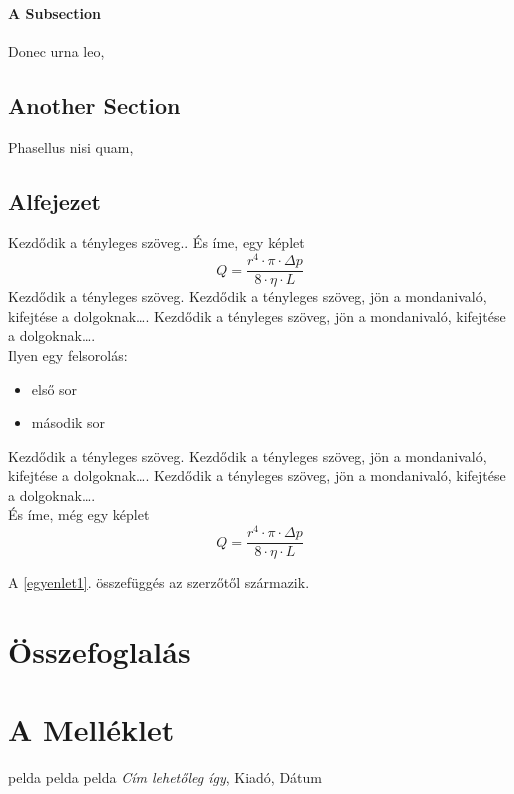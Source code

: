\documentclass[a4paper,12pt,oneside]{book}
\begin{document}
\subsubsection{A Subsection}

Donec urna leo, 

\section{Another Section}

Phasellus nisi quam, 

\section{Alfejezet}
Kezdődik a tényleges szöveg..
És íme, egy képlet
\begin{equation}
Q=\frac{r^4\cdot \pi \cdot \Delta p}{8\cdot \eta\cdot L}
\end{equation}
Kezdődik a tényleges szöveg. Kezdődik a tényleges szöveg, jön a mondanivaló, kifejtése a dolgoknak…. Kezdődik a tényleges szöveg, jön a mondanivaló, kifejtése a dolgoknak….\\

Ilyen egy felsorolás:
\begin{itemize}
	\item első sor
	\item második sor
\end{itemize}
Kezdődik a tényleges szöveg. Kezdődik a tényleges szöveg, jön a mondanivaló, kifejtése a dolgoknak…. Kezdődik a tényleges szöveg, jön a mondanivaló, kifejtése a dolgoknak….\\

És íme, még egy képlet
\begin{equation}\label{egyenlet1}
Q=\frac{r^4\cdot \pi \cdot \Delta p}{8\cdot \eta\cdot L}
\end{equation}

A \ref{egyenlet1}. összefüggés az \cite{irodalom1} szerzőtől származik.
\backmatter
\chapter{Összefoglalás}
\appendix

\chapter{A Melléklet}


\renewcommand{\refname}{Irodalomjegyzék}
\begin{thebibliography}{9}
     pelda
     pelda
	pelda \textit{Cím lehetőleg így}, Kiadó, Dátum

\end{thebibliography}
\end{document}
